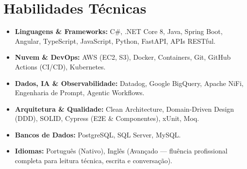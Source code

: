 \documentclass[a4paper,10pt]{article}
\begin{document}
\section{Habilidades Técnicas}
    \begin{itemize}
        \item \textbf{Linguagens \& Frameworks:} C\#, .NET Core 8, Java, Spring Boot, Angular, TypeScript, JavaScript, Python, FastAPI, APIs RESTful.
        \item \textbf{Nuvem \& DevOps:} AWS (EC2, S3), Docker, Containers, Git, GitHub Actions (CI/CD), Kubernetes.
        \item \textbf{Dados, IA \& Observabilidade:} Datadog, Google BigQuery, Apache NiFi, Engenharia de Prompt, Agentic Workflows.
        \item \textbf{Arquitetura \& Qualidade:} Clean Architecture, Domain-Driven Design (DDD), SOLID, Cypress (E2E \& Componentes), xUnit, Moq.
        \item \textbf{Bancos de Dados:} PostgreSQL, SQL Server, MySQL.
        \item \textbf{Idiomas:} Português (Nativo), Inglês (Avançado — fluência profissional completa para leitura técnica, escrita e conversação).
    \end{itemize}
\end{document}
